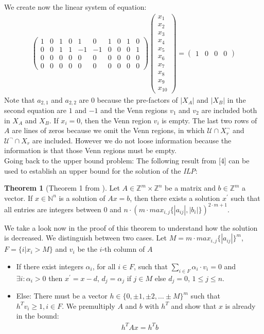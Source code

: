 \documentclass{book}
\theoremstyle{break}
\theoremstyle{definition}
\newtheorem{mythe}{Theorem}
\begin{document}
We create now the linear system of equation:
\begin{align*}
\left ( \begin{array}{cccccccccc}
1&0&1&0&1&0&1&0&1&0\\
0&0&1&1&-1&-1&0&0&0&1\\
0&0&0&0&0&0&0&0&0&0\\
0&0&0&0&0&0&0&0&0&0
\end{array} \right )\left ( \begin{array}{c}
x_1\\x_2\\x_3\\x_4\\x_5\\x_6\\x_7\\x_8\\x_9\\x_{10}
\end{array}\right )=\left ( \begin{array}{cccc}
1&0&0&0
\end{array}\right )
\end{align*}
Note that $a_{2,1}$ and $a_{2,2}$ are $0$ because the pre-factors of $|X_A|$ and $|X_B|$ in the second equation are $1$ and $-1$ and the Venn regions $v_1$ and $v_2$ are included both in $X_A$ and $X_B$. If $x_i=0$, then the Venn region $v_i$ is empty. The last two rows of $A$ are lines of zeros because we omit the Venn regions, in which $\mathcal{U}\cap X_r^\neg$ and $\mathcal{U}^\neg\cap X_r$ are included. However we do not loose information because the information is that those Venn regions must be empty.\\
Going back to the upper bound problem: The following result from [4] can be used to establish an upper bound for the solution of the \textit{ILP}:
\begin{mythe}[Theorem 1 from \cite{knapsack}]\label{upper bound}
Let $A\in \mathbb{Z}^m\times \mathbb{Z}^n$ be a matrix and $b\in\mathbb{Z}^m$ a vector. If $x\in\mathbb{N}^n$ is a solution of $Ax=b$, then there exists a solution $x^\prime$ such that all entries are integers between $0$ and $n\cdot (m\cdot max_{i,j}\{|a_{ij}|,|b_i|\})^{2\cdot m+1}$.
\end{mythe}
We take a look now in the proof of this theorem to understand how the solution is decreased. We distinguish between two cases. Let $M=m\cdot max_{i,j}\{|a_{ij}|\}^m$, $F=\{i|x_i>M\}$ and $v_i$ be the $i$-th column of $A$
\begin{itemize}
\item If there exist integers $\alpha_i$, for all $i\in F$, such that $\sum_{i\in F}\alpha_i\cdot v_i=0$ and $\exists i: \alpha_i>0$ then $x^\prime=x-d$, $d_j=\alpha_j$ if $j\in M$ else $d_j=0$, $1\leq j\leq n$.
\item Else: There must be a vector $h\in\{0,\pm 1,\pm 2,\dots \pm M\}^m$ such that $h^T v_i\geq1, i\in F$. We premultiply $A$ and $b$ with $h^T$ and show that $x$ is already in the bound:
\begin{align*}
h^TA x = h^Tb
\end{align*}
\end{itemize}
\end{document}
